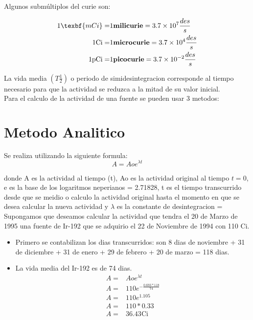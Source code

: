 \documentclass[11pt, oneside]{book}
\begin{document}
Algunos submúltiplos del curie son:

\begin{align*}
  1 \texbf{mCi} =& 1 \textbf{milicurie}  = 3.7 \times 10^{7} \frac{des}{s}\\
  1 \text{Ci}   =& 1 \textbf{microcurie} = 3.7 \times 10^{4} \frac{des}{s}\\
  1 \text{pCi}  =& 1 \textbf{picocurie}  = 3.7 \times 10^{-2} \frac{des}{s}
\end{align*}

La vida media $(T\frac{1}{2})$ o periodo de simidesintegracion corresponde al tiempo necesario para que la actividad se reduzca a la mitad de su valor inicial.\\

Para el calculo de la actividad de una fuente se pueden usar 3 metodos:

\section{Metodo Analitico}
Se realiza utilizando la siguiente formula:
\[A = Aoe^{\lambda t}\]

donde A es la actividad al tiempo (t), Ao es la actividad original al tiempo $t=0$, e es la base de los logaritmos neperianos = 2.71828, t es el tiempo transcurrido desde que se meidio o calculo la actividad original hasta el momento en que se desea calcular la nueva actividad y $\lambda$ es la constante de desintegracion = \\

Supongamos que deseamos calcular la actividad que tendra el 20 de Marzo de 1995 una fuente de Ir-192 que se adquirio el 22 de Noviembre de 1994 con 110 Ci.
\begin{itemize}
  \item Primero se contabilizan los dias transcurridos: son 8 dias de noviembre + 31 de diciembre + 31 de enero + 29 de febrero + 20 de marzo = 118 dias.
  \item La vida media del Ir-192 es de 74 dias.
    \begin{align*}
      A=& Aoe^{\lambda t}\\
      A=& 110 e ^{-\frac{0.693 * 118}{74}}\\
      A=& 110 e^{1.105}\\
      A=& 110 * 0.33\\
      A=& 36.43 \text{Ci}
    \end{align*}
\end{itemize}
\end{document}
